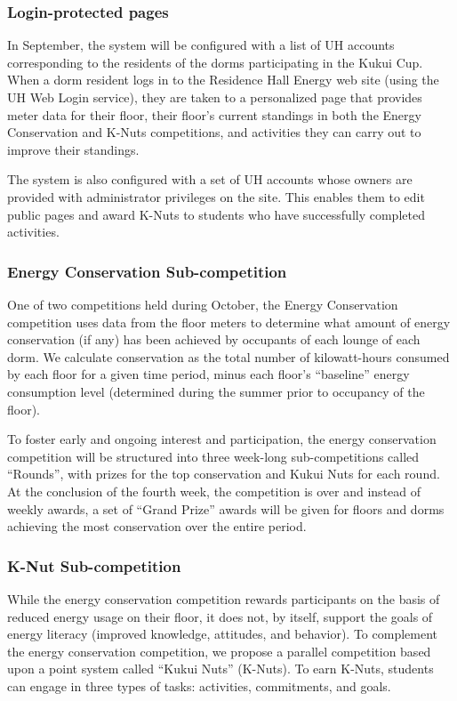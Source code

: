 \documentclass[11pt]{article}
\begin{document}
\subsubsection{Login-protected pages}
 
In September, the system will
be configured with a list of UH accounts corresponding to the residents of
the dorms participating in the Kukui Cup.  When a dorm resident logs in to
the Residence Hall Energy web site (using the UH Web Login service), they are taken
to a personalized page that provides meter data for their floor, their
floor's current standings in both the Energy Conservation and K-Nuts
competitions, and activities they can carry out to improve their standings.

The system is also configured
with a set of UH accounts whose owners are provided with administrator
privileges on the site.  This enables them to edit public pages and award
K-Nuts to students who have successfully completed activities.

\subsubsection{Energy Conservation Sub-competition}

One of two competitions
held during October, the Energy Conservation competition uses data from the
floor meters to determine what amount of energy conservation (if any) has
been achieved by occupants of each lounge of each dorm.  We calculate
conservation as the total number of kilowatt-hours consumed by each floor
for a given time period, minus each floor's ``baseline'' energy consumption
level (determined during the summer prior to occupancy of the floor).

To foster early and ongoing interest and participation, the energy
conservation competition will be structured into three week-long
sub-competitions called ``Rounds'', with prizes for the top conservation and Kukui Nuts
for each round.  At the conclusion of the fourth week, the competition is over and
instead of weekly awards, a set of ``Grand Prize'' awards will be given for
floors and dorms achieving the most conservation over the entire period.

\subsubsection{K-Nut  Sub-competition}

While the energy conservation
competition rewards participants on the basis of reduced energy usage on
their floor, it does not, by itself, support the goals of energy literacy
(improved knowledge, attitudes, and behavior).  To complement the energy
conservation competition, we propose a parallel competition based upon a
point system called ``Kukui Nuts'' (K-Nuts).   To earn K-Nuts, students can 
engage in three types of tasks: activities, commitments, and goals.
\end{document}
